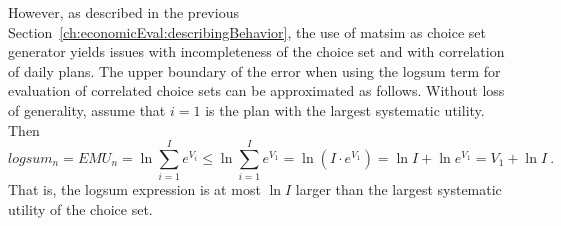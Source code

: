 However, as described in the previous Section~\ref{ch:economicEval:describingBehavior}, the use of \acrshort{matsim} as choice set generator yields issues with incompleteness of the choice set and with correlation of daily plans.
%
%
%
%
%
The upper boundary of the error when using the logsum term for evaluation of correlated choice sets can be approximated as follows.  Without loss of generality, assume that $i=1$ is the plan with the largest systematic utility.  Then
\[
logsum_n = EMU_n = \ln \sum_{i=1}^{I} e^{V_{i}}
%
\le \ln \sum_{i=1}^{I} e^{V_{1}}
%
= \ln ( I \cdot e^{V_{1}} )
%
= \ln I + \ln e^{V_{1}}
%
= V_{1} + \ln I \ .
\]
That is, the logsum expression is at most $\ln I$ larger than the largest systematic utility of the choice set.

